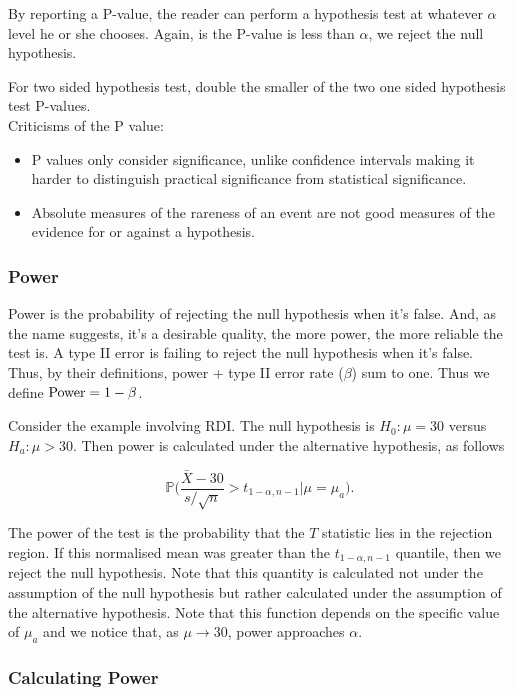 \documentclass{homework}
\begin{document}
By reporting a P-value, the reader can perform a hypothesis test at whatever $\alpha$ level he or she chooses. Again, is the P-value is less than $\alpha$, we reject the null hypothesis.

For two sided hypothesis test, double the smaller of the two one sided hypothesis test P-values. \\ 

Criticisms of the P value:

\begin{itemize}
    \item P values only consider significance, unlike confidence intervals making it harder to distinguish practical significance from statistical significance.
    \item Absolute measures of the rareness of an event are not good measures of the evidence for or against a hypothesis.
\end{itemize}

\clearpage

\subsubsection{Power}

Power is the probability of rejecting the null hypothesis when it's false. And, as the name suggests, it's a desirable quality, the more power, the more reliable the test is. A type II error is failing to reject the null hypothesis when it's false. Thus, by their definitions, power + type II error rate ($\beta$) sum to one. Thus we define $\textnormal{Power} = 1- \beta$.

Consider the example involving RDI. The null hypothesis is $H_0 : \mu = 30$ versus $H_a : \mu > 30$. Then power is calculated under the alternative hypothesis, as follows  

$$
\mathds{P}\bigg(\frac{\bar{X}-30}{s/\sqrt{n}} > t_{1-\alpha, n-1} \bigg | \mu = \mu_a\bigg).
$$

The power of the test is the probability that the $T$ statistic lies in the rejection region. If this normalised mean was greater than the $t_{1-\alpha, n-1}$ quantile, then we reject the null hypothesis. Note that this quantity is calculated not under the assumption of the null hypothesis but rather calculated under the assumption of the alternative hypothesis. Note that this function depends on the specific value of $\mu_a$ and we notice that, as $\mu \rightarrow 30$, power approaches $\alpha$. 

\subsubsection{Calculating Power}
\end{document}
